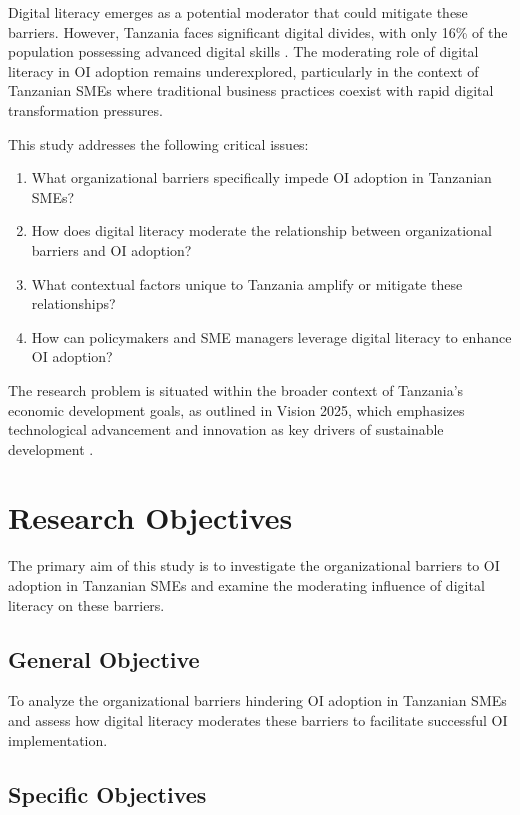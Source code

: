 Digital literacy emerges as a potential moderator that could mitigate these barriers. However, Tanzania faces significant digital divides, with only 16\% of the population possessing advanced digital skills \citep{itu2022digital}. The moderating role of digital literacy in OI adoption remains underexplored, particularly in the context of Tanzanian SMEs where traditional business practices coexist with rapid digital transformation pressures.

This study addresses the following critical issues:
\begin{enumerate}
    \item What organizational barriers specifically impede OI adoption in Tanzanian SMEs?
    \item How does digital literacy moderate the relationship between organizational barriers and OI adoption?
    \item What contextual factors unique to Tanzania amplify or mitigate these relationships?
    \item How can policymakers and SME managers leverage digital literacy to enhance OI adoption?
\end{enumerate}

The research problem is situated within the broader context of Tanzania's economic development goals, as outlined in Vision 2025, which emphasizes technological advancement and innovation as key drivers of sustainable development \citep{tanzania2000vision}.

\section{Research Objectives}

The primary aim of this study is to investigate the organizational barriers to OI adoption in Tanzanian SMEs and examine the moderating influence of digital literacy on these barriers.

\subsection{General Objective}

To analyze the organizational barriers hindering OI adoption in Tanzanian SMEs and assess how digital literacy moderates these barriers to facilitate successful OI implementation.

\subsection{Specific Objectives}

